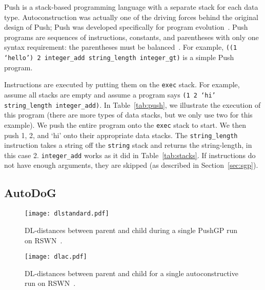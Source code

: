 \documentclass{sig-alternate}
\begin{document}
Push is a stack-based programming language with a separate stack for each data type. Autoconstruction was actually one of the driving forces behind the original design of Push; Push was developed specifically for program evolution~\cite{spector:2016}. Push programs are sequences of instructions, constants, and parentheses with only one syntax requirement: the parentheses must be balanced~\cite{lee:2001}. For example, \texttt{((1 `hello') 2 integer\_add string\_length integer\_gt)} is a simple Push program.

Instructions are executed by putting them on the \texttt{exec} stack. For example, assume all stacks are empty and assume a program says \texttt{(1 2 `hi' string\_length integer\_add)}. In Table~\ref{tab:push}, we illustrate the execution of this program (there are more types of data stacks, but we only use two for this example). We push the entire program onto the \texttt{exec} stack to start. We then push 1, 2, and `hi' onto their appropriate data stacks. The \texttt{string\_length} instruction takes a string off the \texttt{string} stack and returns the string-length, in this case 2. \texttt{integer\_add} works as it did in Table~\ref{tab:stacks}. If instructions do not have enough arguments, they are skipped (as described in Section~\ref{sec:sgp}).~\cite{lee:tutorial}


\subsection{AutoDoG}
\label{sec:autodog}

\begin{figure*}
	\centering
	\begin{minipage}[b]{0.4\textwidth}
		\texttt{[image: dlstandard.pdf]}
		\caption{DL-distances between parent and child during a single PushGP run on RSWN~\cite{spector:2016}.}
		\label{fig:standard}
	\end{minipage}
	\hfill
	\begin{minipage}[b]{0.4\textwidth}
		\texttt{[image: dlac.pdf]}
		\caption{DL-distances between parent and child for a single autoconstructive run on RSWN~\cite{spector:2016}.}
		\label{fig:ac}
	\end{minipage}
\end{figure*}
\end{document}

